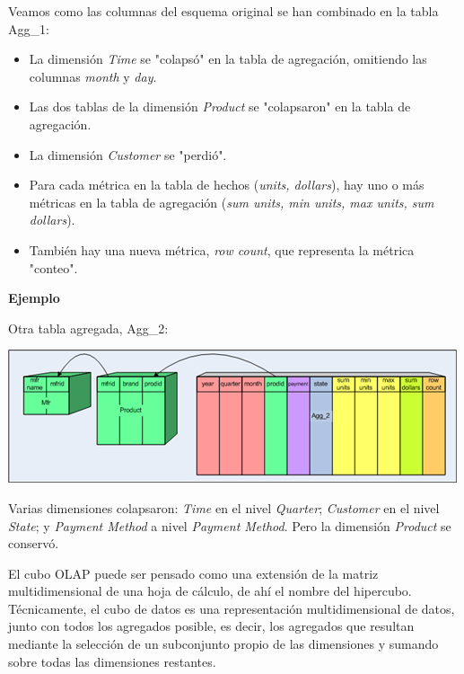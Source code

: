 \documentclass{fancyslides}
\begin{document}
\begin{frame}
\misc
{Veamos como las columnas del esquema original se han combinado en la tabla Agg\_1:

\begin{itemize}
  \item La dimensión \textit{Time} se "colapsó" en la tabla de agregación, omitiendo las columnas \textit{month} y \textit{day}.
  \item Las dos tablas de la dimensión \textit{Product} se "colapsaron" en la tabla de agregación.
  \item La dimensión \textit{Customer} se "perdió".
  \item Para cada métrica en la tabla de hechos (\textit{units, dollars}), hay uno o más métricas en la tabla de agregación (\textit{sum units, min units, max units, sum dollars}).
  \item También hay una nueva métrica, \textit{row count}, que representa la métrica "conteo".
\end{itemize}
}
\end{frame}


\begin{frame}
\misc
{
\textbf{Ejemplo}

Otra tabla agregada, Agg\_2:

\begin{center}
\includegraphics[scale=0.6]{aggregate_tables_3}
\end{center}

Varias dimensiones colapsaron: \textit{Time} en el nivel \textit{Quarter}; \textit{Customer} en el nivel \textit{State};
y \textit{Payment Method} a nivel \textit{Payment Method}. Pero la dimensión \textit{Product} se conservó.}
\end{frame}


\begin{frame}
\end{frame}

\begin{frame}
\misc
{
El cubo OLAP puede ser pensado como una extensión de la matriz multidimensional de una hoja de cálculo, de ahí el nombre del hipercubo. Técnicamente, el cubo de datos es una representación multidimensional de datos, junto con todos los agregados posible, es decir, los agregados que resultan mediante la selección de un subconjunto propio de las dimensiones y sumando sobre todas las dimensiones restantes.
}
\end{frame}
\end{document}
